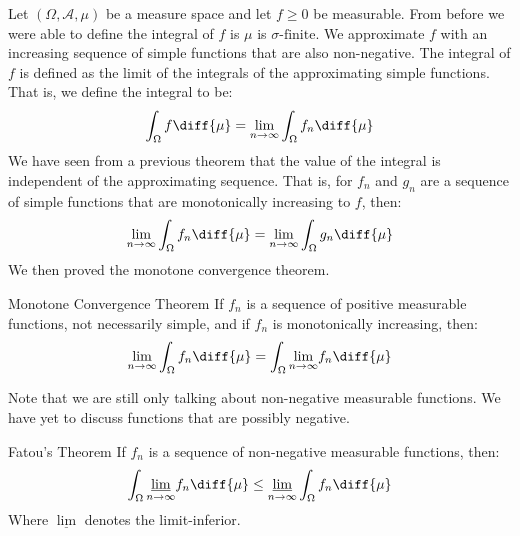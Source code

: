     Let $(\Omega,\mathcal{A},\mu)$ be a measure space and let
    $f\geq{0}$ be measurable. From before we were able to define
    the integral of $f$ is $\mu$ is $\sigma\textrm{-finite}$. We
    approximate $f$ with an increasing sequence of simple functions
    that are also non-negative. The integral of $f$ is defined as
    the limit of the integrals of the approximating
    simple functions. That is, we define the integral to be:
    \begin{equation}
        \int_{\Omega}f\diff{\mu}=
        \underset{n\rightarrow\infty}{\lim}
        \int_{\Omega}f_{n}\diff{\mu}
    \end{equation}
    We have seen from a previous theorem that the value
    of the integral is independent of the approximating
    sequence. That is, for $f_{n}$ and $g_{n}$ are a
    sequence of simple functions that are monotonically
    increasing to $f$, then:
    \begin{equation}
        \underset{n\rightarrow\infty}{\lim}
        \int_{\Omega}f_{n}\diff{\mu}=
        \underset{n\rightarrow\infty}{\lim}
        \int_{\Omega}g_{n}\diff{\mu}
    \end{equation}
    We then proved the monotone convergence theorem.
    \begin{ltheorem}{Monotone Convergence Theorem}
        If $f_{n}$ is a sequence of positive measurable functions,
        not necessarily simple, and if $f_{n}$ is monotonically
        increasing, then:
        \begin{equation}
            \underset{n\rightarrow\infty}{\lim}
            \int_{\Omega}f_{n}\diff{\mu}
            =\int_{\Omega}
            \underset{n\rightarrow\infty}{\lim}f_{n}\diff{\mu}
        \end{equation}
    \end{ltheorem}
    Note that we are still only talking about non-negative measurable
    functions. We have yet to discuss functions that are possibly
    negative.
    \begin{ltheorem}{Fatou's Theorem}
        If $f_{n}$ is a sequence of non-negative measurable functions,
        then:
        \begin{equation}
            \int_{\Omega}
            \underset{n\rightarrow\infty}{\underline{\lim}}
            f_{n}\diff{\mu}
            \leq
            \underset{n\rightarrow\infty}{\underline{\lim}}
            \int_{\Omega}f_{n}\diff{\mu}
        \end{equation}
        Where $\underline{\lim}$ denotes the limit-inferior.
    \end{ltheorem}
